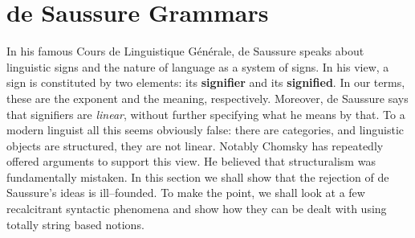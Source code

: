 \section{de Saussure Grammars}
\label{kap4-8}
%
%
%
In his famous Cours de Linguistique G\'en\'erale, de Saussure 
speaks about linguistic signs and the nature of language as a system of
signs. In his view, a sign is constituted by two elements: 
its \textbf{signifier}
and its \textbf{signified}. In our terms, these are the exponent and the
meaning, respectively. Moreover, de Saussure says that signifiers
are {\it linear}, without further specifying what he means by that.
To a modern linguist all this seems obviously false: there are
categories, and linguistic objects are structured, they are not
linear. Notably Chomsky 
has repeatedly offered arguments to support
this view. He believed that structuralism was fundamentally mistaken.
In this section we shall show that the rejection of de Saussure's ideas 
is ill--founded. To make the point, we shall look at a few recalcitrant 
syntactic phenomena and show how they can be dealt with using totally 
string based notions. 

